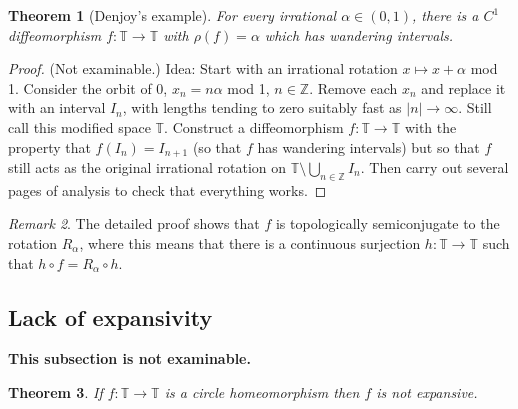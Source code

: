 \documentclass[12pt]{article}
\newtheorem{theorem}{Theorem}[section]
\theoremstyle{definition}
\theoremstyle{remark}
\newtheorem{remark}[theorem]{Remark}
\begin{document}
\begin{theorem} [Denjoy's example]
For every irrational $\alpha \in (0,1)$, there is a $C^1$ diffeomorphism $f : \mathbb T \to \mathbb T$ with 
$\rho(f)=\alpha$ which has wandering intervals.
\end{theorem}

\begin{proof}
(Not examinable.) %
Idea: Start with an irrational rotation $x \mapsto x+\alpha$ mod 1. 
Consider the orbit of $0$, $x_n = n\alpha$ mod 1, $n \in \mathbb Z$. Remove each $x_n$ and replace it with 
an interval $I_n$, with lengths tending to zero suitably fast as $|n| \to \infty$. Still call this modified space $\mathbb T$.
Construct a diffeomorphism $f : \mathbb T \to \mathbb T$ with the property that $f(I_n) =I_{n+1}$ 
(so that $f$ has wandering intervals) but so that $f$ still acts as the original irrational rotation on $\mathbb T \setminus \bigcup_{n\in \mathbb Z} I_n$.
Then carry out several pages of analysis to check that everything works.
\end{proof}

\begin{remark}
The detailed proof shows that $f$ is topologically semiconjugate to the rotation $R_\alpha$, where this means that there is a continuous surjection $h : \mathbb T \to \mathbb T$ such that
$h \circ f = R_\alpha \circ h$.
\end{remark}





\subsection{Lack of expansivity}

\noindent
{\bf This subsection is not examinable.}

\begin{theorem}
If $f : \mathbb T \to \mathbb T$ is a circle homeomorphism then $f$ is not expansive.
\end{theorem}
\end{document}
